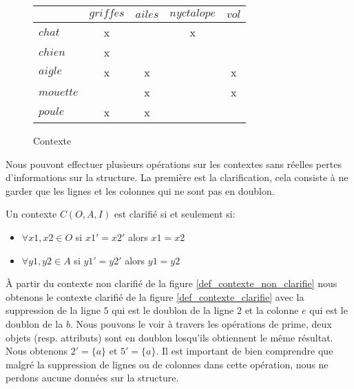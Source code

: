 \begin{figure}[H]
	\begin{center}
		\begin{tabular}{ l | c c c c }
			 & $griffes$ & $ailes$ & $nyctalope$ & $vol$ \\
			\hline
			$chat$ & x & & x & \\
			$chien$ & x & & & \\
			$aigle$ & x & x & & x \\
			$mouette$ & & x & & x \\
			$poule$ & x & x & & \\
		\end{tabular}
	\end{center}
	\caption{Contexte}
	\label{def_contexte}
\end{figure} 

Nous pouvont effectuer plusieurs opérations sur les contextes sans réelles pertes d'informations sur la structure. La première est la clarification, cela consiste à ne garder que les lignes et les colonnes qui ne sont pas en doublon.

\begin{definition}
Un contexte $C(O, A, I)$ est clarifié si et seulement si:
\begin{itemize}
	\item $\forall x1, x2 \in O$ si ${x1}' = {x2}'$ alors $x1 = x2$
	\item $\forall y1, y2 \in A$ si ${y1}' = {y2}'$ alors $y1 = y2$
\end{itemize}
\end{definition}

À partir du contexte non clarifié de la figure \ref{def_contexte_non_clarifie} nous obtenons le contexte clarifié de la figure \ref{def_contexte_clarifie} avec la suppression de la ligne $5$ qui est le doublon de la ligne $2$ et la colonne $e$ qui est le doublon de la $b$. Nous pouvons le voir à travers les opérations de prime, deux objets (resp. attributs) sont en doublon losqu'ils obtiennent le même résultat. Nous obtenons $2' = \{a\}$ et $5' = \{a\}$. Il est important de bien comprendre que malgré la suppression de lignes ou de colonnes dans cette opération, nous ne perdons aucune données sur la structure.

